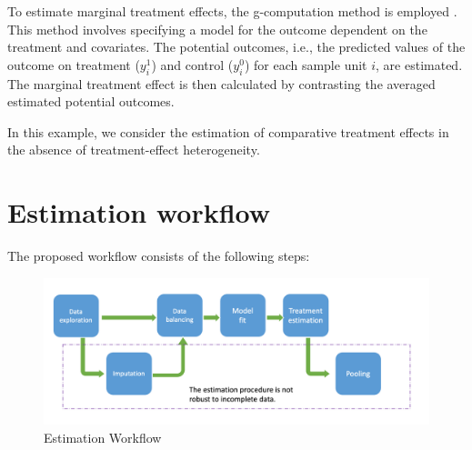 \documentclass[
  letterpaper,
  DIV=11,
  numbers=noendperiod]{scrreprt}
\begin{document}
To estimate marginal treatment effects, the g-computation method is
employed \cite{snowden_implementation_2011}. This method involves
specifying a model for the outcome dependent on the treatment and
covariates. The potential outcomes, i.e., the predicted values of the
outcome on treatment (\(y_i^1\)) and control (\(y_i^0\)) for each sample
unit \(i\), are estimated. The marginal treatment effect is then
calculated by contrasting the averaged estimated potential outcomes.

In this example, we consider the estimation of comparative treatment
effects in the absence of treatment-effect heterogeneity.

\hypertarget{estimation-workflow}{%
\section{Estimation workflow}\label{estimation-workflow}}

The proposed workflow consists of the following steps:

\begin{figure}

{\centering \includegraphics{resources/chapter 09/Workflow.png}

}

\caption{Estimation Workflow}

\end{figure}
\end{document}
